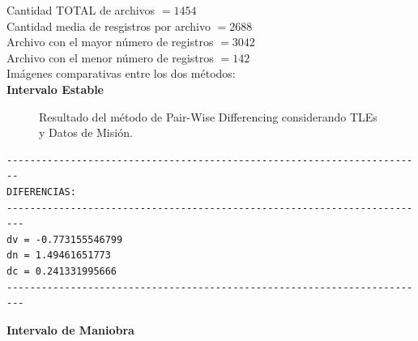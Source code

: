 \noindent
Cantidad TOTAL de archivos $=  1454$\\
Cantidad media de resgistros por archivo $=  2688$\\
Archivo con el mayor n\'umero de registros $=  3042$\\
Archivo con el menor n\'umero de registros $=  142$\\

Im\'agenes comparativas entre los dos m\'etodos:\\
{\bf{Intervalo Estable}}\\
\begin{figure}[htbp]
 \centering
 \caption{Resultado del m\'etodo de Pair-Wise Differencing considerando TLEs y Datos de Misi\'on.}
 \label{fig:test}
\end{figure}

\begin{verbatim}
------------------------------------------------------------------------
DIFERENCIAS:
-------------------------------------------------------------------------
dv = -0.773155546799
dn = 1.49461651773
dc = 0.241331995666
-------------------------------------------------------------------------
\end{verbatim}

{\bf{Intervalo de Maniobra}}

